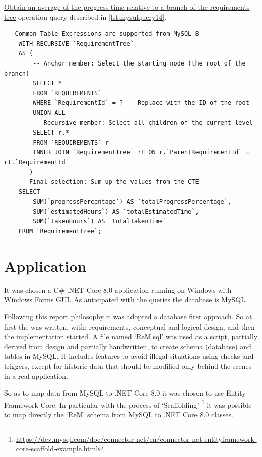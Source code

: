\documentclass[12pt, a4paper]{report}
\begin{document}
\hyperref[subsubsec:op14]{Obtain an average of the progress time relative to a branch of the requirements tree} operation
query described in \autoref{lst:mysqlquery14}.

\begin{lstlisting}[language=MySQL, caption={\texorpdfstring{\hyperref[subsubsec:op14]{op. 14}}{op. 14}}, label={lst:mysqlquery14}]
    -- Common Table Expressions are supported from MySQL 8
    WITH RECURSIVE `RequirementTree`
    AS (
        -- Anchor member: Select the starting node (the root of the branch)
        SELECT *
        FROM `REQUIREMENTS`
        WHERE `RequirementId` = ? -- Replace with the ID of the root
        UNION ALL
        -- Recursive member: Select all children of the current level
        SELECT r.*
        FROM `REQUIREMENTS` r
        INNER JOIN `RequirementTree` rt ON r.`ParentRequirementId` = rt.`RequirementId`
       )
    -- Final selection: Sum up the values from the CTE
    SELECT
        SUM(`progressPercentage`) AS `totalProgressPercentage`,
        SUM(`estimatedHours`) AS `totalEstimatedTime`,
        SUM(`takenHours`) AS `totalTakenTime`
    FROM `RequirementTree`;
\end{lstlisting}

\newpage
\section*{Application}

It was chosen a C\# .NET Core 8.0 application running on Windows with Windows Forms GUI.
As anticipated with the queries the database is MySQL.

Following this report philosophy it was adopted a database first approach.
So at first the  was written, with: requirements, conceptual and logical design, and then the
implementation started.
A file named `ReM.sql' was used as a script, partially derived from design and partially handwritten, to create schema (database)
and tables in MySQL. It includes features to avoid illegal situations using checks and triggers, except for historic data that
should be modified only behind the scenes in a real application.

So as to map data from MySQL to .NET Core 8.0 it was chosen to use Entity Framework Core.
In particular with the process of `Scaffolding'
\footnote{\url{https://dev.mysql.com/doc/connector-net/en/connector-net-entityframework-core-scaffold-example.html}}
it was possible to map directly the `ReM' schema from MySQL to .NET Core 8.0 classes.
\end{document}
